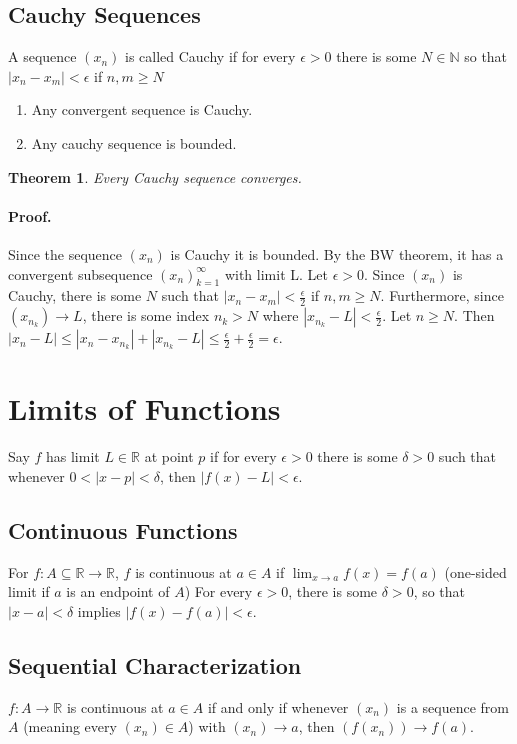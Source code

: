 \documentclass[11pt]{article}
\newcommand{\N}{{\mathbb N}}
\newcommand{\R}{{\mathbb R}}
\newtheorem {thm}{Theorem}
\begin{document}
\subsection{Cauchy Sequences}
A sequence $(x_n)$ is called Cauchy if for every $\epsilon > 0$ there is some $N \in \N$ so that $|x_n - x_m| < \epsilon$
if $n, m \geq N$
\begin{enumerate}
	\item Any convergent sequence is Cauchy.
	\item Any cauchy sequence is bounded.
\end{enumerate}

\begin{thm}
Every Cauchy sequence converges.
\end{thm}
\paragraph{Proof.} Since the sequence $(x_n)$ is Cauchy it is bounded. By the BW theorem, it has a convergent subsequence $(x_n)^\infty_{k = 1}$ with limit L. Let $\epsilon > 0$. Since $(x_n)$ is Cauchy, there is some $N$ such that
$|x_n - x_m| < \frac{\epsilon}{2}$ if $n, m \geq N$. Furthermore, since $(x_{n_k}) \longrightarrow L$, there is some index
$n_k > N$ where $|x_{n_k} - L| < \frac{\epsilon}{2}$. Let $n \geq N$. Then $|x_n - L| \leq |x_n - x_{n_k}| + |x_{n_k} - L| \leq \frac{\epsilon}{2} + \frac{\epsilon}{2} = \epsilon$.

\newpage
\section{Limits of Functions}
Say $f$ has limit $L \in \R$ at point $p$ if for every $\epsilon > 0$ there is some $\delta > 0$ such that whenever $0 < |x - p| < \delta$, then $|f(x) - L| < \epsilon$.

\subsection{Continuous Functions}
For $f: A \subseteq \R \longrightarrow \R$, $f$ is continuous at $a \in A$ if $\lim_{x \to a} f(x) = f(a)$ (one-sided limit if $a$ is an endpoint of $A$)
For every $\epsilon > 0$, there is some $\delta > 0$, so that $|x - a| < \delta$ implies $|f(x) - f(a)| < \epsilon$.

\subsection{Sequential Characterization}
$f: A \longrightarrow \R$ is continuous at $a \in A$ if and only if whenever $(x_n)$ is a sequence from $A$ (meaning every $(x_n) \in A$) with $(x_n) \to a$, then $(f(x_n)) \to f(a)$.
\end{document}

